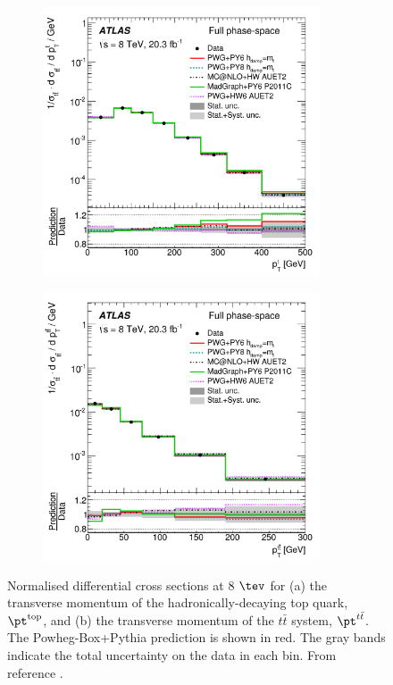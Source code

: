 \begin{figure}[h!]
\begin{subfigure}{0.5\textwidth}
  \centering
  \includegraphics[width=0.9\textwidth]{figures/Datasamples/topptatlas.png}
  \caption{}
  \label{fig:dat:ttl:top}
\end{subfigure}
\begin{subfigure}{0.5\textwidth}
  \centering
  \includegraphics[width=0.9\textwidth]{figures/Datasamples/ttbarptatlas.png}
  \caption{}
  \label{fig:dat:ttl:ttbar}
\end{subfigure}

\captionsetup{width=0.85\textwidth} \caption{\small Normalised differential cross sections at 8 $\tev$ for (a) the transverse momentum of the hadronically-decaying top quark, $\pt^{\rm top}$, and (b) the transverse momentum of the $t\bar{t}$ system, $\pt^{t\bar{t}}$. The {\sc Powheg-Box+Pythia} prediction is shown in red. The gray bands indicate the total uncertainty on the data in each bin. From reference \cite{Aad:2015mbv}.}
\label{fig:dat:ttl:8tev}
\end{figure}


